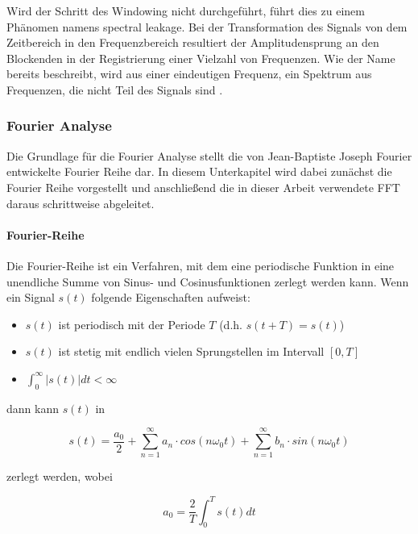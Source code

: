 Wird der Schritt des Windowing nicht durchgeführt, führt dies zu einem Phänomen namens spectral leakage.
Bei der Transformation des Signals von dem Zeitbereich in den Frequenzbereich resultiert der Amplitudensprung an den Blockenden in der Registrierung einer Vielzahl von Frequenzen.
Wie der Name bereits beschreibt, wird aus einer eindeutigen Frequenz, ein Spektrum aus Frequenzen, die nicht Teil des Signals sind \autocite[vgl.][S. 1296]{wu_new_2012}.


\subsubsection{Fourier Analyse}
Die Grundlage für die Fourier Analyse stellt die von Jean-Baptiste Joseph Fourier entwickelte Fourier Reihe dar.
In diesem Unterkapitel wird dabei zunächst die Fourier Reihe vorgestellt und anschließend die in dieser Arbeit verwendete \ac{FFT} daraus schrittweise abgeleitet.

\paragraph{Fourier-Reihe}


Die Fourier-Reihe ist ein Verfahren, mit dem eine periodische Funktion in eine unendliche Summe von Sinus- und Cosinusfunktionen zerlegt werden kann.
Wenn ein Signal $s(t)$ folgende Eigenschaften aufweist:

\begin{itemize}
    \item $s(t)$ ist periodisch mit der Periode $T$ (d.h. $s(t+T) = s(t)$)
    \item $s(t)$ ist stetig mit endlich vielen Sprungstellen im Intervall $[0,T]$
    \item $\int_{0}^{\infty} |s(t)| dt < \infty$
\end{itemize}

dann kann $s(t)$ in

\begin{equation}
s(t) = \frac{a_0}{2} + \sum_{n=1}^{\infty} a_n \cdot cos(n\omega_0t) + \sum_{n=1}^{\infty} b_n \cdot sin(n\omega_0t)
\end{equation}

zerlegt werden, wobei

\begin{equation}
a_0 = \frac{2}{T} \int_{0}^{T} s(t) dt
\end{equation}

